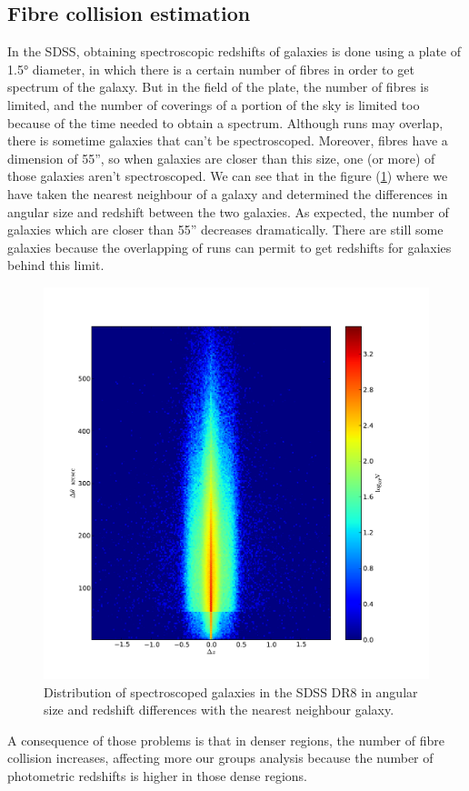 \subsection{Fibre collision estimation}
%
In the SDSS, obtaining spectroscopic redshifts of galaxies is done using a
plate of 1.5° diameter, in which there is a certain number of fibres in
order to get spectrum of the galaxy. But in the field of the plate, the number
of fibres is limited, and the number of coverings of a portion of the sky is
limited too because of the time needed to obtain a spectrum. Although runs may
overlap, there is sometime galaxies that can't be spectroscoped. Moreover,
fibres have a dimension of 55'', so when galaxies are closer than this
size, one (or more) of those galaxies aren't spectroscoped. We can see that in
the figure (\ref{fig:angreddist}) where we have taken the nearest neighbour of a
galaxy and determined the differences in angular size and redshift between the
two galaxies. As expected, the number of galaxies which are closer than
55'' decreases dramatically. There are still some galaxies because the
overlapping of runs can permit to get redshifts for galaxies behind this limit.
\begin{figure}[ht]
    \centering
    \includegraphics[width=0.6\linewidth]{figures/sdss/distredSDSSDR8}
    \caption{\footnotesize{}Distribution of spectroscoped galaxies in the SDSS DR8 in angular size and redshift differences with
    the nearest neighbour galaxy.}
\label{fig:angreddist}
\end{figure}

A consequence of those problems is that in denser regions, the number of fibre
collision increases, affecting more our groups analysis because the number of
photometric redshifts is higher in those dense regions.

